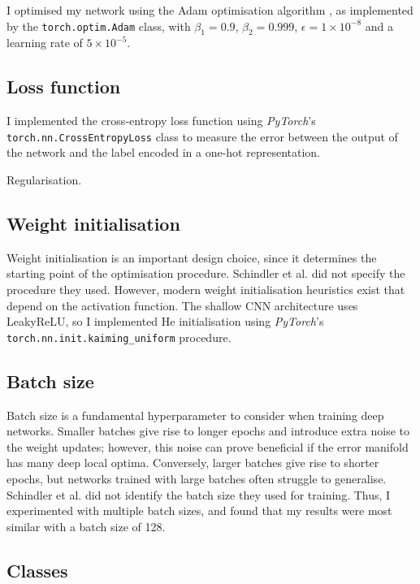 \documentclass[conference]{IEEEtran}
\begin{document}
I optimised my network using the Adam optimisation algorithm \cite{KingmaBa}, as implemented by the \texttt{torch.optim.Adam} class, with $\beta_1=0.9$, $\beta_2=0.999$, $\epsilon=1\times10^{-8}$ and a learning rate of $5\times10^{-5}$.

\subsection{Loss function}

I implemented the cross-entropy loss function using \textit{PyTorch}'s \texttt{torch.nn.CrossEntropyLoss} class to measure the error between the output of the network and the label encoded in a one-hot representation.

Regularisation.

\subsection{Weight initialisation}

Weight initialisation is an important design choice, since it determines the starting point of the optimisation procedure.
Schindler et al. did not specify the procedure they used.
However, modern weight initialisation heuristics exist that depend on the activation function.
The shallow CNN architecture uses LeakyReLU, so I implemented He initialisation using \textit{PyTorch}'s \texttt{torch.nn.init.kaiming\_uniform} procedure.

\subsection{Batch size}

Batch size is a fundamental hyperparameter to consider when training deep networks.
Smaller batches give rise to longer epochs and introduce extra noise to the weight updates; however, this noise can prove beneficial if the error manifold has many deep local optima.
Conversely, larger batches give rise to shorter epochs, but networks trained with large batches often struggle to generalise.
Schindler et al. did not identify the batch size they used for training.
Thus, I experimented with multiple batch sizes, and found that my results were most similar with a batch size of 128.

\subsection{Classes}
\end{document}
